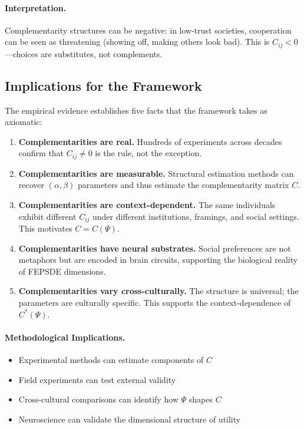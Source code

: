 \paragraph{Interpretation.}
Complementarity structures can be negative: in low-trust societies,
cooperation can be seen as threatening (showing off, making others look bad).
This is $C_{ij} < 0$---choices are substitutes, not complements.

\subsection{Implications for the Framework}

The empirical evidence establishes five facts that the framework takes as axiomatic:

\begin{enumerate}
  \item \textbf{Complementarities are real.}
        Hundreds of experiments across decades confirm that $C_{ij} \neq 0$
        is the rule, not the exception.

  \item \textbf{Complementarities are measurable.}
        Structural estimation methods can recover $(\alpha, \beta)$ parameters
        and thus estimate the complementarity matrix $C$.

  \item \textbf{Complementarities are context-dependent.}
        The same individuals exhibit different $C_{ij}$ under different
        institutions, framings, and social settings.
        This motivates $C = C(\Psi)$.

  \item \textbf{Complementarities have neural substrates.}
        Social preferences are not metaphors but are encoded in brain circuits,
        supporting the biological reality of FEPSDE dimensions.

  \item \textbf{Complementarities vary cross-culturally.}
        The structure is universal; the parameters are culturally specific.
        This supports the context-dependence of $C^*(\Psi)$.
\end{enumerate}

\paragraph{Methodological Implications.}
\begin{itemize}
  \item Experimental methods can estimate components of $C$
  \item Field experiments can test external validity
  \item Cross-cultural comparisons can identify how $\Psi$ shapes $C$
  \item Neuroscience can validate the dimensional structure of utility
\end{itemize}

